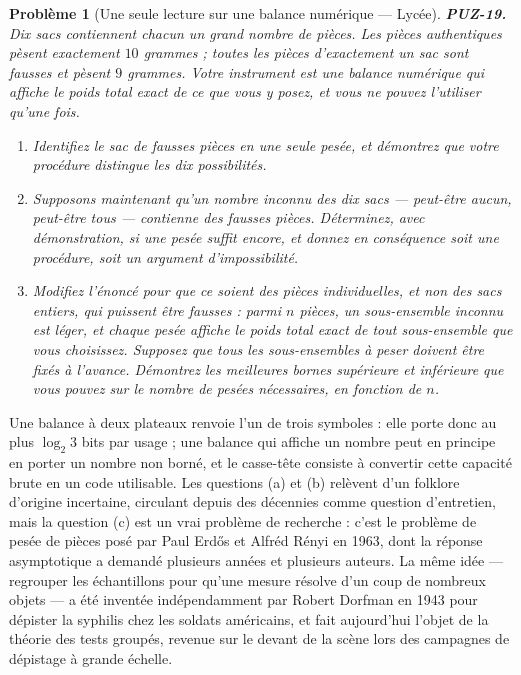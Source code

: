 \documentclass[11pt]{article}
\newtheorem{problem}{Problème}
\begin{document}
\begin{problem}[{Une seule lecture sur une balance numérique --- Lycée}]
\textbf{PUZ-19.} Dix sacs contiennent chacun un grand nombre de pièces. Les pièces authentiques pèsent exactement $ 10 $ grammes ; toutes les pièces d'exactement un sac sont fausses et pèsent $ 9 $ grammes. Votre instrument est une balance numérique qui affiche le poids total exact de ce que vous y posez, et vous ne pouvez l'utiliser qu'une fois.
\begin{enumerate}
\item[(a)] Identifiez le sac de fausses pièces en une seule pesée, et démontrez que votre procédure distingue les dix possibilités.
\item[(b)] Supposons maintenant qu'un nombre inconnu des dix sacs --- peut-être aucun, peut-être tous --- contienne des fausses pièces. Déterminez, avec démonstration, si une pesée suffit encore, et donnez en conséquence soit une procédure, soit un argument d'impossibilité.
\item[(c)] Modifiez l'énoncé pour que ce soient des pièces individuelles, et non des sacs entiers, qui puissent être fausses : parmi $ n $ pièces, un sous-ensemble inconnu est léger, et chaque pesée affiche le poids total exact de tout sous-ensemble que vous choisissez. Supposez que tous les sous-ensembles à peser doivent être fixés à l'avance. Démontrez les meilleures bornes supérieure et inférieure que vous pouvez sur le nombre de pesées nécessaires, en fonction de $ n $.
\end{enumerate}

\end{problem}

\noindent Une balance à deux plateaux renvoie l'un de trois symboles : elle porte donc au plus $ \log_2 3 $ bits par usage ; une balance qui affiche un nombre peut en principe en porter un nombre non borné, et le casse-tête consiste à convertir cette capacité brute en un code utilisable. Les questions (a) et (b) relèvent d'un folklore d'origine incertaine, circulant depuis des décennies comme question d'entretien, mais la question (c) est un vrai problème de recherche : c'est le problème de pesée de pièces posé par Paul Erd\H{o}s et Alfréd Rényi en 1963, dont la réponse asymptotique a demandé plusieurs années et plusieurs auteurs. La même idée --- regrouper les échantillons pour qu'une mesure résolve d'un coup de nombreux objets --- a été inventée indépendamment par Robert Dorfman en 1943 pour dépister la syphilis chez les soldats américains, et fait aujourd'hui l'objet de la théorie des tests groupés, revenue sur le devant de la scène lors des campagnes de dépistage à grande échelle.
\end{document}
